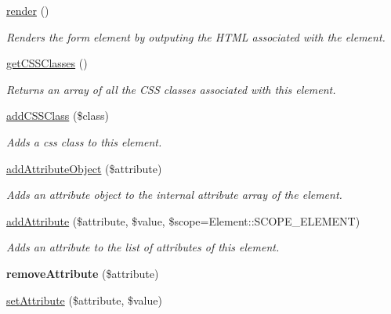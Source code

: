 \begin{DoxyCompactItemize}
\item 
\hyperlink{class_element_a8fd45d1d43cf11f3dadab39b0306a960}{render} ()
\begin{DoxyCompactList}\small\item\em Renders the form element by outputing the HTML associated with the element. \item\end{DoxyCompactList}\item 
\hyperlink{class_element_a5a2f684a61827f1746b22088ab44c165}{getCSSClasses} ()
\begin{DoxyCompactList}\small\item\em Returns an array of all the CSS classes associated with this element. \item\end{DoxyCompactList}\item 
\hypertarget{class_element_a40aa7d96105b28f43e00a1a0c72c468e}{
\hyperlink{class_element_a40aa7d96105b28f43e00a1a0c72c468e}{addCSSClass} (\$class)}
\label{class_element_a40aa7d96105b28f43e00a1a0c72c468e}

\begin{DoxyCompactList}\small\item\em Adds a css class to this element. \item\end{DoxyCompactList}\item 
\hyperlink{class_element_a1d3879d70e9f706515b99077a733709f}{addAttributeObject} (\$attribute)
\begin{DoxyCompactList}\small\item\em Adds an attribute object to the internal attribute array of the element. \item\end{DoxyCompactList}\item 
\hyperlink{class_element_a21b080bb4ec8177446be448e05acf2f9}{addAttribute} (\$attribute, \$value, \$scope=Element::SCOPE\_\-ELEMENT)
\begin{DoxyCompactList}\small\item\em Adds an attribute to the list of attributes of this element. \item\end{DoxyCompactList}\item 
\hypertarget{class_element_a23357dbb4eccfdd32d71ae01d5b3f9ec}{
{\bfseries removeAttribute} (\$attribute)}
\label{class_element_a23357dbb4eccfdd32d71ae01d5b3f9ec}

\item 
\hypertarget{class_element_a287118e555c6c465b91ce778ae727fd0}{
\hyperlink{class_element_a287118e555c6c465b91ce778ae727fd0}{setAttribute} (\$attribute, \$value)}
\label{class_element_a287118e555c6c465b91ce778ae727fd0}


\end{DoxyCompactItemize}
